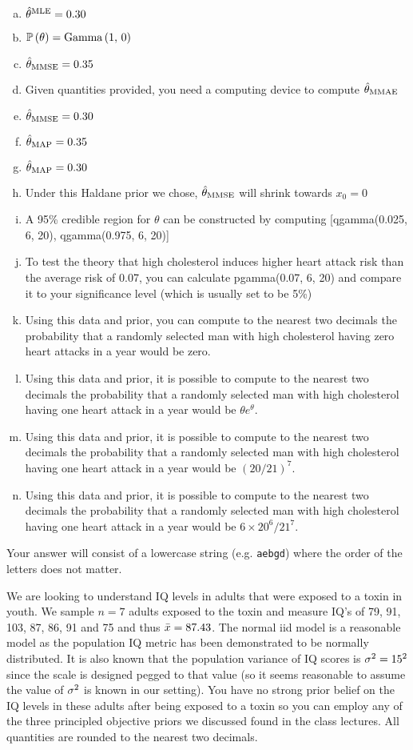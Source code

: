 \documentclass[12pt,landscape]{article}
\newcommand{\instr}{\small Your answer will consist of a lowercase string (e.g. \texttt{aebgd}) where the order of the letters does not matter. \normalsize}
\begin{document}
\vspace{-0.2cm}\benum{} 

\begin{enumerate}[(a)]
\item $\hat{\theta}^{\mathrm{MLE}} = 0.30$ 
\item $\mathbb{P}\left(\theta\right) = \mathrm{Gamma}\left(1,\,0\right)$
\item $\hat{\theta}_{\mathrm{MMSE}} = 0.35$ 
\item Given quantities provided, you need a computing device to compute $\hat{\theta}_{\mathrm{MMAE}}$
\item $\hat{\theta}_{\mathrm{MMSE}} = 0.30$ 
\item $\hat{\theta}_{\mathrm{MAP}} = 0.35$ 
\item $\hat{\theta}_{\mathrm{MAP}} = 0.30$ 
\item Under this Haldane prior we chose, $\hat{\theta}_{\mathrm{MMSE}}$ will shrink towards $x_0 = 0$
\item A 95\% credible region for $\theta$ can be constructed by computing [qgamma(0.025, 6, 20), qgamma(0.975, 6, 20)]
\item To test the theory that high cholesterol induces higher heart attack risk than the average risk of 0.07, you can calculate pgamma(0.07, 6, 20) and compare it to your significance level (which is usually set to be 5\%)
\item Using this data and prior, you can compute to the nearest two decimals the probability that a randomly selected man with high cholesterol having zero heart attacks in a year would be zero.
\item Using this data and prior, it is possible to compute to the nearest two decimals the probability that a randomly selected man with high cholesterol having one heart attack in a year would be $\theta e^\theta$.
\item Using this data and prior, it is possible to compute to the nearest two decimals the probability that a randomly selected man with high cholesterol having one heart attack in a year would be $(20 / 21)^7$.
\item Using this data and prior, it is possible to compute to the nearest two decimals the probability that a randomly selected man with high cholesterol having one heart attack in a year would be $6 \times 20^6 / 21^7$.
\end{enumerate}
\eenum\instr\pagebreak


\problem{} We are looking to understand IQ levels in adults that were exposed to a toxin in youth. We sample $n = 7$ adults exposed to the toxin and measure IQ's of 79,  91, 103,  87,  86,  91 and  75 and thus $\bar{x} = 87.43$. The normal iid model is a reasonable model as the population IQ metric has been demonstrated to be normally distributed. It is also known that the population variance of IQ scores is $\sigma^2 = 15^2$ since the scale is designed pegged to that value (so it seems reasonable to assume the value of $\sigma^2$ is known in our setting). You have no strong prior belief on the IQ levels in these adults after being exposed to a toxin so you can employ any of the three principled objective priors we discussed found in the class lectures. All quantities are rounded to the nearest two decimals.
\end{document}
